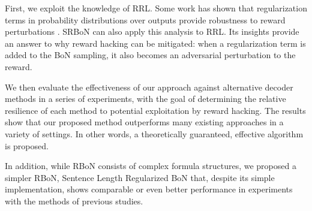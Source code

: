 
First, we exploit the knowledge of RRL. Some work has shown that regularization terms in probability distributions over outputs provide robustness to reward perturbations \citep{ortega2014adversarial,husain2021regularized,NEURIPS2021_bb1443cc,eysenbach2022maximum,pan2022the,NEURIPS2021_bb1443cc}. 
SRBoN can also apply this analysis to RRL. Its insights provide an answer to why reward hacking can be mitigated: when a regularization term is added to the BoN sampling, it also becomes an adversarial perturbation to the reward.


We then evaluate the effectiveness of our approach against alternative decoder methods in a series of experiments, with the goal of determining the relative resilience of each method to potential exploitation by reward hacking. The results show that our proposed method outperforms many existing approaches in a variety of settings. In other words, a theoretically guaranteed, effective algorithm is proposed.

In addition, while RBoN consists of complex formula structures, we proposed a simpler RBoN, Sentence Length Regularized BoN that, despite its simple implementation, shows comparable or even better performance in experiments with the methods of previous studies.


